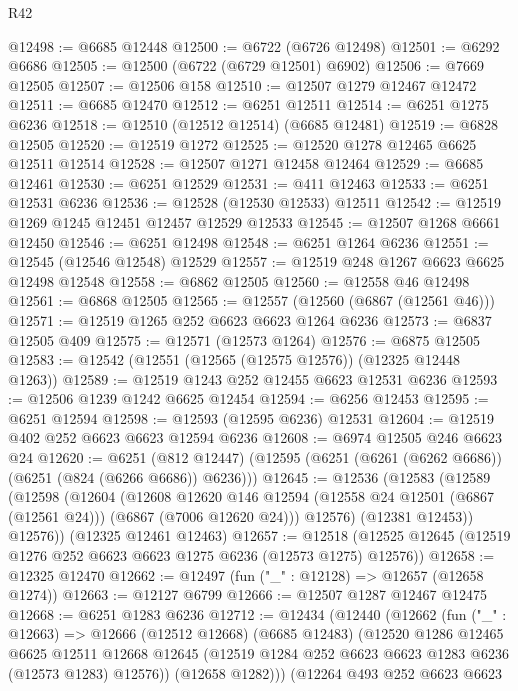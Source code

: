 \begin{lexlean}{R42}
\begin{coremodule}
{@12498 := @6685 @12448
@12500 := @6722 (@6726 @12498)
@12501 := @6292 @6686
@12505 := @12500 (@6722 (@6729 @12501) @6902)
@12506 := @7669 @12505
@12507 := @12506 @158
@12510 := @12507 @1279 @12467 @12472
@12511 := @6685 @12470
@12512 := @6251 @12511
@12514 := @6251 @1275 @6236
@12518 := @12510 (@12512 @12514) (@6685 @12481)
@12519 := @6828 @12505
@12520 := @12519 @1272
@12525 := @12520 @1278 @12465 @6625 @12511 @12514
@12528 := @12507 @1271 @12458 @12464
@12529 := @6685 @12461
@12530 := @6251 @12529
@12531 := @411 @12463
@12533 := @6251 @12531 @6236
@12536 := @12528 (@12530 @12533) @12511
@12542 := @12519 @1269 @1245 @12451 @12457 @12529 @12533
@12545 := @12507 @1268 @6661 @12450
@12546 := @6251 @12498
@12548 := @6251 @1264 @6236
@12551 := @12545 (@12546 @12548) @12529
@12557 := @12519 @248 @1267 @6623 @6625 @12498 @12548
@12558 := @6862 @12505
@12560 := @12558 @46 @12498
@12561 := @6868 @12505
@12565 := @12557 (@12560 (@6867 (@12561 @46)))
@12571 := @12519 @1265 @252 @6623 @6623 @1264 @6236
@12573 := @6837 @12505 @409
@12575 := @12571 (@12573 @1264)
@12576 := @6875 @12505
@12583 := @12542 (@12551 (@12565 (@12575 @12576)) (@12325 @12448 @1263))
@12589 := @12519 @1243 @252 @12455 @6623 @12531 @6236
@12593 := @12506 @1239 @1242 @6625 @12454
@12594 := @6256 @12453
@12595 := @6251 @12594
@12598 := @12593 (@12595 @6236) @12531
@12604 := @12519 @402 @252 @6623 @6623 @12594 @6236
@12608 := @6974 @12505 @246 @6623 @24
@12620 := @6251
    (@812 @12447)
    (@12595 (@6251 (@6261 (@6262 @6686)) (@6251 (@824 (@6266 @6686)) @6236)))
@12645 := @12536
    (@12583
      (@12589
        (@12598
          (@12604
            (@12608
              @12620
              @146
              @12594
              (@12558 @24 @12501 (@6867 (@12561 @24)))
              (@6867 (@7006 @12620 @24)))
            @12576)
          (@12381 @12453))
        @12576))
    (@12325 @12461 @12463)
@12657 := @12518 (@12525 @12645 (@12519 @1276 @252 @6623 @6623 @1275 @6236 (@12573 @1275) @12576))
@12658 := @12325 @12470
@12662 := @12497 (fun ("_" : @12128) => @12657 (@12658 @1274))
@12663 := @12127 @6799
@12666 := @12507 @1287 @12467 @12475
@12668 := @6251 @1283 @6236
@12712 := @12434
    (@12440
      (@12662
        (fun ("_" : @12663) =>
        @12666
          (@12512 @12668)
          (@6685 @12483)
          (@12520
            @1286
            @12465
            @6625
            @12511
            @12668
            @12645
            (@12519 @1284 @252 @6623 @6623 @1283 @6236 (@12573 @1283) @12576))
          (@12658 @1282)))
      (@12264
        @493
        @252
        @6623
        @6623
}
\end{coremodule}
\end{lexlean}
